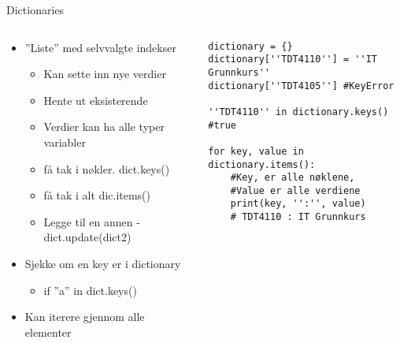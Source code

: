 \documentclass[screen, aspectratio=169]{beamer}
\begin{document}
\begin{frame}[fragile]{Dictionaries}
	\begin{columns}
		\begin{column}{.5\textwidth}
			\begin{itemize}
				\item ''Liste'' med selvvalgte indekser
				\begin{itemize}
					\item Kan sette inn nye verdier
					\item Hente ut eksisterende
					\item Verdier kan ha alle typer variabler
					\item få tak i nøkler. dict.keys()
					\item få tak i alt dic.items() 
					\item Legge til en annen - dict.update(dict2)
				\end{itemize}
				\item Sjekke om en key er i dictionary
				\begin{itemize}
				    \item if ''a'' in dict.keys()
				\end{itemize}
				\item Kan iterere gjennom alle elementer
			\end{itemize}
		\end{column}
		\begin{column}{.5\textwidth}
			\begin{lstlisting}
dictionary = {}
dictionary[''TDT4110''] = ''IT Grunnkurs''
dictionary[''TDT4105''] #KeyError

''TDT4110'' in dictionary.keys() #true

for key, value in dictionary.items(): 
    #Key, er alle nøklene, 
    #Value er alle verdiene
	print(key, '':'', value) 
	# TDT4110 : IT Grunnkurs
			\end{lstlisting}
		\end{column}
	\end{columns}
\end{frame}
\end{document}
